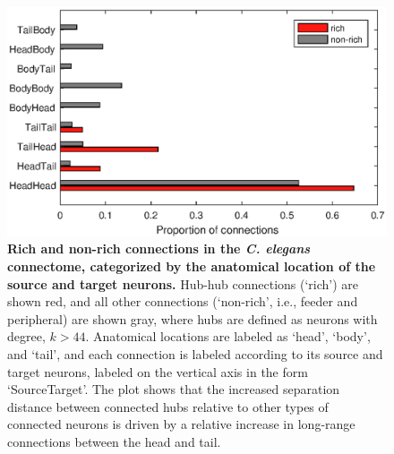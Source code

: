 \documentclass[10pt,letterpaper]{article}
\begin{document}
{%
\begin{figure}[h]
\centering
    \includegraphics[width=1\textwidth]{connectionProportionDivision.eps}
\caption{
\textbf{Rich and non-rich connections in the \emph{C. elegans} connectome, categorized by the  anatomical location of the source and target neurons.}
\label{fig:S_connectionProportion}
Hub-hub connections (`rich') are shown red, and all other connections (`non-rich', i.e., feeder and peripheral) are shown gray, where hubs are defined as neurons with degree, $k > 44$.
Anatomical locations are labeled as `head', `body', and `tail', and each connection is labeled according to its source and target neurons, labeled on the vertical axis in the form `SourceTarget'.
The plot shows that the increased separation distance between connected hubs relative to other types of connected neurons is driven by a relative increase in long-range connections between the head and tail.
}
\end{figure}


}
\end{document}

